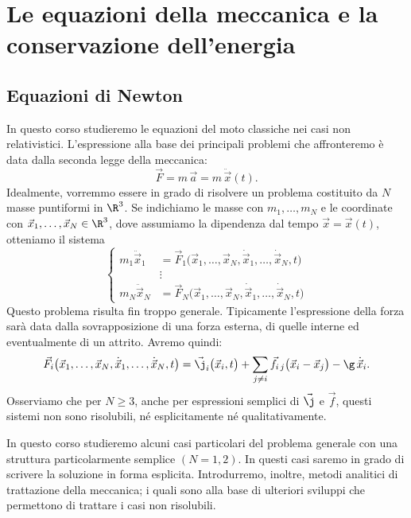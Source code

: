%
%
\chapter{Le equazioni della meccanica e la conservazione dell'energia}
\section{Equazioni di Newton}

In questo corso studieremo le equazioni del moto classiche nei casi non relativistici.
L'espressione alla base dei principali problemi che affronteremo è data dalla seconda legge della meccanica:
\[
	\vec{F} = m\,\vec{a} = m\,\ddot{\vec{x}}(t).
\]
Idealmente, vorremmo essere in grado di risolvere un problema costituito da \(N\) masse puntiformi in \(\R^3\).
Se indichiamo le masse con \(m_1, \ldots, m_N\) e le coordinate con \(\vec{x}_1, \ldots, \vec{x}_N\in\R^3\), dove assumiamo la dipendenza dal tempo \(\vec{x}=\vec{x}(t)\), otteniamo il sistema
\[
	\left\{\begin{aligned}
		m_1 \ddot{\vec{x}}_1 & = \vec{F}_1\big(\vec{x}_1,\ldots,\vec{x}_N, \dot{\vec{x}}_1, \ldots, \dot{\vec{x}}_N, t\big) \\
		                     & \vdots                                                                                       \\
		m_N \ddot{\vec{x}}_N & = \vec{F}_N\big(\vec{x}_1,\ldots,\vec{x}_N, \dot{\vec{x}}_1, \ldots, \dot{\vec{x}}_N, t\big)
	\end{aligned}\right.
\]
Questo problema risulta fin troppo generale. Tipicamente l'espressione della forza sarà data dalla sovrapposizione di una forza esterna, di quelle interne ed eventualmente di un attrito.
Avremo quindi:
\[
	\vec{F}_i\big(\vec{x}_1,\ldots,\vec{x}_N, \dot{\vec{x}}_1, \ldots, \dot{\vec{x}}_N, t\big) = \vec{\j}_i\big(\vec{x}_i,t\big) + \sum_{j\neq i} \vec{f}_{i\,j}\big(\vec{x}_i - \vec{x}_j\big) - \g\,\dot{\vec{x}}_i.
\]
Osserviamo che per \(N\ge 3\), anche per espressioni semplici di \(\vec{\j}\) e \(\vec{f}\), questi sistemi non sono risolubili, né esplicitamente né qualitativamente.

In questo corso studieremo alcuni casi particolari del problema generale con una struttura particolarmente semplice \((N=1,2)\). In questi casi saremo in grado di scrivere la soluzione in forma esplicita.
Introdurremo, inoltre, metodi analitici di trattazione della meccanica; i quali sono alla base di ulteriori sviluppi che permettono di trattare i casi non risolubili.

